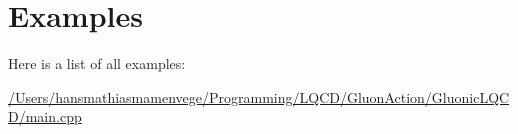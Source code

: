 \section{Examples}
Here is a list of all examples\+:\begin{DoxyCompactItemize}
\item 
\mbox{\hyperlink{_2_users_2hansmathiasmamenvege_2_programming_2_l_q_c_d_2_gluon_action_2_gluonic_l_q_c_d_2main_8cpp-example}{/\+Users/hansmathiasmamenvege/\+Programming/\+L\+Q\+C\+D/\+Gluon\+Action/\+Gluonic\+L\+Q\+C\+D/main.\+cpp}}
\end{DoxyCompactItemize}

